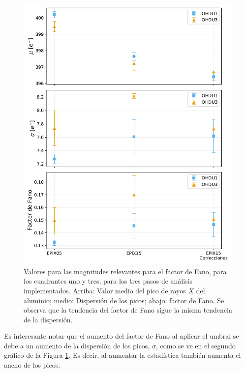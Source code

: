 \begin{figure}[h]
    \centering
        \includegraphics[scale=0.5]{Figs/Al_mu_sigma_fano.pdf}
    \caption{\footnotesize{Valores para las magnitudes relevantes para el factor de Fano, para los cuadrantes uno y tres, para los tres pasos de análisis implementados. Arriba: Valor medio del pico de rayos $X$ del aluminio; medio: Dispersión de los picos; abajo: factor de Fano. Se observa que la tendencia del factor de Fano sigue la misma tendencia de la dispersión.}}
    \label{fig:Al_mu_sigma_fano}
\end{figure}

Es interesante notar que el aumento del factor de Fano al aplicar el umbral se debe a un aumento de la dispersión de los picos, $\sigma$, como se ve en el segundo gráfico de la Figura \ref{fig:Al_mu_sigma_fano}. Es decir, al aumentar la estadística también aumenta el ancho de los picos.

